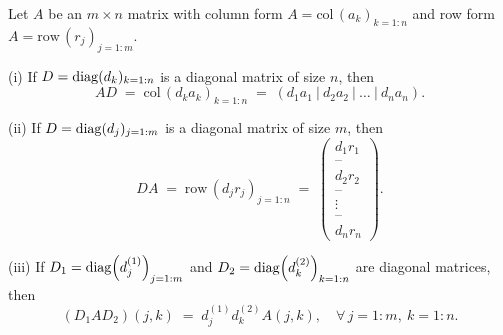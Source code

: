 \begin{lemma}
Let $A$ be an $m\times n$ matrix with column form
$A=\mathrm{col}\,(a_k)_{k=1:n}$ and row form $A=\mathrm{row}\,(r_j)_{j=1:m}$.

(i) If $D=\operatorname{diag}(d_k)_{k=1:n}$ is a diagonal matrix of size $n$, then
\begin{equation}
AD \;=\; \mathrm{col}\,(d_ka_k)_{k=1:n} \;=\; (d_1a_1\ |\ d_2a_2\ |\ \ldots\ |\ d_na_n).
\end{equation}

(ii) If $D=\operatorname{diag}(d_j)_{j=1:m}$ is a diagonal matrix of size $m$, then
\begin{equation}
DA \;=\; \mathrm{row}\,(d_jr_j)_{j=1:n} \;=\;
\begin{pmatrix} d_1r_1 \\ \text{--} \\ d_2r_2 \\ \text{--} \\ \vdots \\ \text{--} \\ d_nr_n \end{pmatrix}.
\end{equation}

(iii) If $D_1=\operatorname{diag}\!\left(d_j^{(1)}\right)_{j=1:m}$ and
$D_2=\operatorname{diag}\!\left(d_k^{(2)}\right)_{k=1:n}$ are diagonal matrices, then
\begin{equation}
(D_1AD_2)(j,k) \;=\; d_j^{(1)}d_k^{(2)}A(j,k), \quad \forall\, j=1:m,\ k=1:n.
\end{equation}
\end{lemma}

